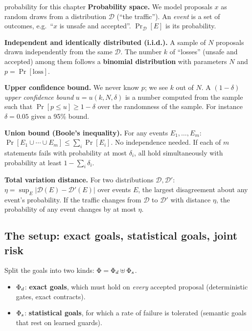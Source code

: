 \begin{toolbox}{probability for this chapter}
\textbf{Probability space.} We model proposals $x$ as random draws from a distribution $\mathcal D$ (``the traffic''). An \emph{event} is a set of outcomes, e.g.\ ``$x$ is unsafe and accepted''. $\Pr_{\mathcal D}[E]$ is its probability.

\textbf{Independent and identically distributed (i.i.d.).} A sample of $N$ proposals drawn independently from the same $\mathcal D$. The number $k$ of ``losses'' (unsafe and accepted) among them follows a \textbf{binomial distribution} with parameters $N$ and $p=\Pr[\text{loss}]$.

\textbf{Upper confidence bound.} We never know $p$; we see $k$ out of $N$. A $(1-\delta)$ \emph{upper confidence bound} $u=u(k,N,\delta)$ is a number computed from the sample such that $\Pr[p\le u]\ge 1-\delta$ over the randomness of the sample. For instance $\delta=0.05$ gives a 95\% bound.

\textbf{Union bound (Boole's inequality).} For any events $E_1,\dots,E_m$: $\Pr[E_1\cup\cdots\cup E_m]\le\sum_i\Pr[E_i]$. No independence needed. If each of $m$ statements fails with probability at most $\delta_i$, all hold simultaneously with probability at least $1-\sum_i\delta_i$.

\textbf{Total variation distance.} For two distributions $\mathcal D,\mathcal D'$: $\eta=\sup_E|\mathcal D(E)-\mathcal D'(E)|$ over events $E$, the largest disagreement about any event's probability. If the traffic changes from $\mathcal D$ to $\mathcal D'$ with distance $\eta$, the probability of any event changes by at most $\eta$.
\end{toolbox}

\subsection{The setup: exact goals, statistical goals, joint risk}

Split the goals into two kinds: $\Phi=\Phi_d\uplus\Phi_s$.

\begin{itemize}
\item $\Phi_d$: \textbf{exact goals}, which must hold on \emph{every} accepted proposal (deterministic gates, exact contracts).
\item $\Phi_s$: \textbf{statistical goals}, for which a rate of failure is tolerated (semantic goals that rest on learned guards).
\end{itemize}

